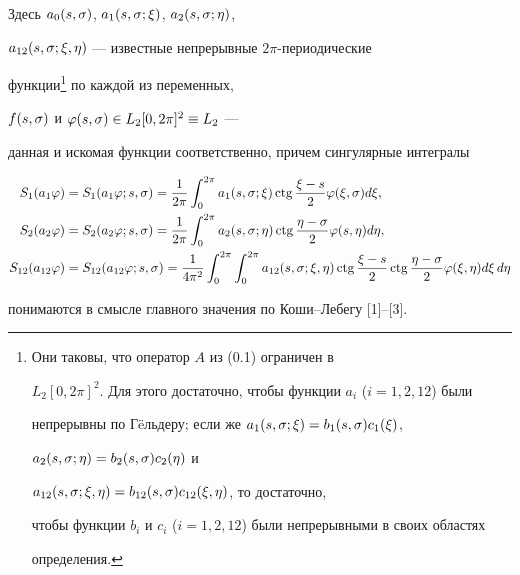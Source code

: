 Здесь $a_0(s,\sigma)$, $a_1(s,\sigma;\xi)$, $a_2(s,\sigma;\eta)$, 


$a_{12}(s,\sigma;\xi,\eta)$ --- известные непрерывные $2\pi$-периодические


функции\footnote{Они таковы, что оператор $A$ из (0.1) ограничен в 


$L_2[0,2\pi]^2$. Для этого достаточно, чтобы функции $a_i$ ($i=1,2,12$) были 


непрерывны по Г\"eльдеру; если же $a_1(s,\sigma;\xi)=b_1(s,\sigma)c_1(\xi)$, 


$a_2(s,\sigma;\eta)=b_2(s,\sigma)c_2(\eta)$ и 


$a_{12}(s,\sigma;\xi,\eta)=b_{12}(s,\sigma)c_{12}(\xi,\eta)$, то достаточно, 


чтобы функции $b_i$ и $c_i$ ($i=1,2,12$) были непрерывными в своих областях 


определения.} по каждой из переменных, 


$f(s,\sigma)$ и $\varphi(s,\sigma)\in L_2[0,2\pi]^2\equiv L_2$ ---


данная и искомая функции соответственно, причем сингулярные интегралы 


\begin{align}


S_1(a_1\varphi)&=S_1(a_1\varphi ;s,\sigma )=\frac{1}{2\pi}\int_0^{2\pi}


a_1(s,\sigma ;\xi )\ctg\frac{\xi -s}{2} \varphi (\xi ,\sigma )d\xi ,\\


%


S_2(a_2\varphi)&=S_2(a_2\varphi ;s,\sigma )=\frac{1}{2\pi}\int_0^{2\pi}


a_2(s,\sigma ;\eta )\ctg \frac{\eta -\sigma }{2}


\varphi (s,\eta )d\eta ,\\


%


S_{12}(a_{12}\varphi)&=


S_{12}(a_{12}\varphi ;s,\sigma )


=\frac{1}{4\pi^2}


\int_0^{2\pi}\int_0^{2\pi}


a_{12}(s,\sigma ;\xi ,\eta )


\ctg \frac{\xi -s}{2}\ctg \frac{\eta -\sigma }{2}


\varphi (\xi ,\eta ) d\xi\, d\eta


\end{align}


понимаются в смысле главного значения по Коши--Лебегу [1]--[3].





